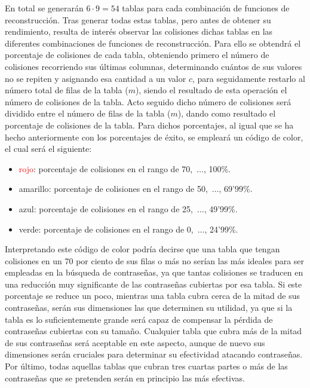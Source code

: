 \documentclass[12pt,spanish,listoffigures,listoftables]{tfgetsinf}
\begin{document}
En total se generarán $6 \cdot 9 = 54$ tablas para cada combinación de funciones de reconstrucción. Tras generar todas estas tablas, pero antes de obtener su rendimiento, resulta de interés observar las colisiones dichas tablas en las diferentes combinaciones de funciones de reconstrucción. Para ello se obtendrá el porcentaje de colisiones de cada tabla, obteniendo primero el número de colisiones recorriendo sus últimas columnas, determinando cuántos de sus valores no se repiten y asignando esa cantidad a un valor $c$, para seguidamente restarlo al número total de filas de la tabla ($m$), siendo el resultado de esta operación el número de colisiones de la tabla. Acto seguido dicho número de colisiones será dividido entre el número de filas de la tabla ($m$), dando como resultado el porcentaje de colisiones de la tabla. Para dichos porcentajes, al igual que se ha hecho anteriormente con los porcentajes de éxito, se empleará un código de color, el cual será el siguiente:

\begin{itemize}

    \item \textcolor{red}{rojo}: porcentaje de colisiones en el rango de 70,~$\dots$, 100\%.
    
    \item \textcolor{y}{amarillo}: porcentaje de colisiones en el rango de 50,~$\dots$, 69'99\%.
    
    \item \textcolor{b}{azul}: porcentaje de colisiones en el rango de 25,~$\dots$, 49'99\%.

    \item \textcolor{g}{verde}: porcentaje de colisiones en el rango de 0,~$\dots$, 24'99\%.
    
\end{itemize}

Interpretando este código de color podría decirse que una tabla que tengan colisiones en un 70 por ciento de sus filas o más no serían las más ideales para ser empleadas en la búsqueda de contraseñas, ya que tantas colisiones se traducen en una reducción muy significante de las contraseñas cubiertas por esa tabla. Si este porcentaje se reduce un poco, mientras una tabla cubra cerca de la mitad de sus contraseñas, serán sus dimensiones las que determinen su utilidad, ya que si la tabla es lo suficientemente grande será capaz de compensar la pérdida de contraseñas cubiertas con su tamaño. Cualquier tabla que cubra más de la mitad de sus contraseñas será aceptable en este aspecto, aunque de nuevo sus dimensiones serán cruciales para determinar su efectividad atacando contraseñas. Por último, todas aquellas tablas que cubran tres cuartas partes o más de las contraseñas que se pretenden serán en principio las más efectivas.
\end{document}
